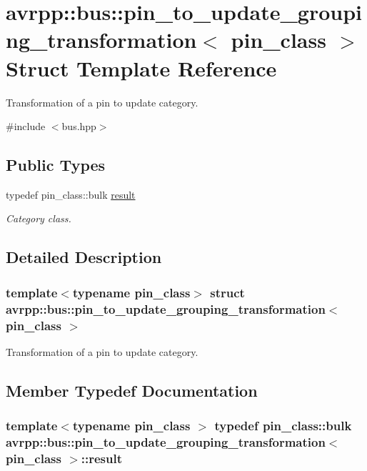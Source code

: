 \hypertarget{structavrpp_1_1bus_1_1pin__to__update__grouping__transformation}{
\section{avrpp::bus::pin\_\-to\_\-update\_\-grouping\_\-transformation$<$ pin\_\-class $>$ Struct Template Reference}
\label{structavrpp_1_1bus_1_1pin__to__update__grouping__transformation}
}


Transformation of a pin to update category.  




{\ttfamily \#include $<$bus.hpp$>$}

\subsection*{Public Types}
\begin{DoxyCompactItemize}
\item 
typedef pin\_\-class::bulk \hyperlink{structavrpp_1_1bus_1_1pin__to__update__grouping__transformation_ac3bc0ea96b55bf3e81a621b90e69b0e7}{result}
\begin{DoxyCompactList}\small\item\em Category class. \item\end{DoxyCompactList}\end{DoxyCompactItemize}


\subsection{Detailed Description}
\subsubsection*{template$<$typename pin\_\-class$>$ struct avrpp::bus::pin\_\-to\_\-update\_\-grouping\_\-transformation$<$ pin\_\-class $>$}

Transformation of a pin to update category. 

\subsection{Member Typedef Documentation}
\hypertarget{structavrpp_1_1bus_1_1pin__to__update__grouping__transformation_ac3bc0ea96b55bf3e81a621b90e69b0e7}{
\subsubsection[{result}]{\setlength{\rightskip}{0pt plus 5cm}template$<$typename pin\_\-class $>$ typedef pin\_\-class::bulk {\bf avrpp::bus::pin\_\-to\_\-update\_\-grouping\_\-transformation}$<$ pin\_\-class $>$::{\bf result}}}
\label{structavrpp_1_1bus_1_1pin__to__update__grouping__transformation_ac3bc0ea96b55bf3e81a621b90e69b0e7}


